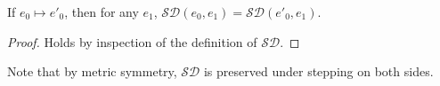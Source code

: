 \begin{lemma}
  If $e_0 \mapsto e'_0$, then for any $e_1$, $\mathcal{SD}(e_0, e_1) =
  \mathcal{SD}(e'_0, e_1)$.
\end{lemma}
\begin{proof}
  Holds by inspection of the definition of $\mathcal{SD}$.
\end{proof}
Note that by metric symmetry, $\mathcal{SD}$ is preserved under stepping on both
sides.



